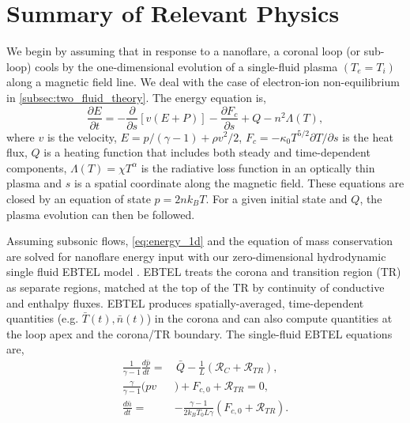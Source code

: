 \documentclass[apj]{emulateapj}
\begin{document}
	\section{Summary of Relevant Physics}
	\label{sec:phys_sum}
	\par We begin by assuming that in response to a nanoflare, a coronal loop (or sub-loop) cools by the one-dimensional evolution of a single-fluid plasma $(T_e = T_i)$ along a magnetic field line. We deal with the case of electron-ion non-equilibrium in  \autoref{subsec:two_fluid_theory}. The energy equation is,
	\begin{equation}
		\label{eq:energy_1d}
		\frac{\partial E}{\partial t} = -\frac{\partial}{\partial s}[v(E+P)] - \frac{\partial F_c}{\partial s} + Q - n^2\Lambda(T),
	\end{equation}
where $v$ is the velocity, $E=p/(\gamma -1) + \rho v^2/2$, $F_c=-\kappa_0 T^{5/2}\partial T/\partial s$ is the heat flux, $Q$ is a heating function that includes both steady and time-dependent components, $\Lambda(T)=\chi T^{\alpha}$ is the radiative loss function in an optically thin plasma \citep[e.g.][]{klimchuk_highly_2008} and $s$ is a spatial coordinate along the magnetic field. These equations are closed by an equation of state $p=2nk_BT$. For a given initial state and $Q$, the plasma evolution can then be followed. 
	\par Assuming subsonic flows, \autoref{eq:energy_1d} and the equation of mass conservation are solved for nanoflare energy input with our zero-dimensional hydrodynamic single fluid EBTEL model \citep[see][for derivations]{klimchuk_highly_2008,cargill_enthalpy-based_2012,cargill_enthalpy-based_2012-1,cargill_modelling_2015}. EBTEL treats the corona and transition region (TR) as separate regions, matched at the top of the TR by continuity of conductive and enthalpy fluxes. EBTEL produces spatially-averaged, time-dependent quantities (e.g. $\bar{T}(t),\bar{n}(t)$) in the corona and can also compute quantities at the loop apex and the corona/TR boundary. The single-fluid EBTEL equations are,
	\begin{align}
		\frac{1}{\gamma - 1}\frac{d\bar{p}}{dt} =& \,\bar{Q} - \frac{1}{L}(\mathcal{R}_C + \mathcal{R}_{TR}), \label{eq:energy_0d} \\
		\frac{\gamma}{\gamma - 1}(pv&) + F_{c,0} + \mathcal{R}_{TR} = 0, \label{eq:tr_energy_0d} \\
		\frac{d\bar{n}}{dt} =& -\frac{\gamma - 1}{2k_BT_0L\gamma}(F_{c,0} + \mathcal{R}_{TR}).\label{eq:mass_0d}
	\end{align}
\end{document}
